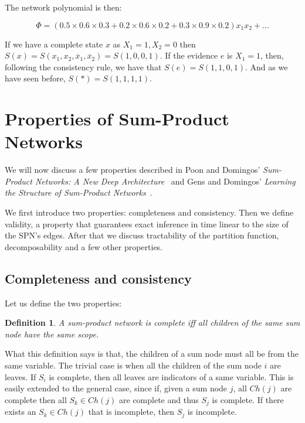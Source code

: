 \documentclass[a4paper,10pt]{article}
\theoremstyle{plain}
\newtheorem*{spn-def}{Definition}
\begin{document}
The network polynomial is then:

\begin{equation*}
  \Phi = (0.5\times0.6\times0.3+0.2\times0.6\times0.2+0.3\times0.9\times0.2)x_1x_2+\ldots
\end{equation*}

If we have a complete state $x$ as $X_1=1,X_2=0$ then $S(x)=S(x_1,x_2,\overline{x}_1,
\overline{x}_2)=S(1,0,0,1)$. If the evidence $e$ is $X_1=1$, then, following the consistency rule,
we have that $S(e)=S(1,1,0,1)$. And as we have seen before, $S(*)=S(1,1,1,1)$.

\newpage

\section{Properties of Sum-Product Networks}

We will now discuss a few properties described in Poon and Domingos' \textit{Sum-Product Networks:
A New Deep Architecture}~\cite{poon-domingos} and Gens and Domingos' \textit{Learning the Structure
of Sum-Product Networks}~\cite{gens-domingos}.

We first introduce two properties: completeness and consistency. Then we define validity, a
property that guarantees exact inference in time linear to the size of the SPN's edges. After that
we discuss tractability of the partition function, decomposability and a few other properties.

\subsection{Completeness and consistency}

Let us define the two properties:

\begin{spn-def}
  A sum-product network is complete iff all children of the same sum node have the same scope.
\end{spn-def}

What this definition says is that, the children of a sum node must all be from the same variable.
The trivial case is when all the children of the sum node $i$ are leaves. If $S_i$ is complete,
then all leaves are indicators of a same variable. This is easily extended to the general case,
since if, given a sum node $j$, all $Ch(j)$ are complete then all $S_k\in Ch(j)$ are complete and
thus $S_j$ is complete. If there exists an $S_k\in Ch(j)$ that is incomplete, then $S_j$ is
incomplete.
\end{document}
